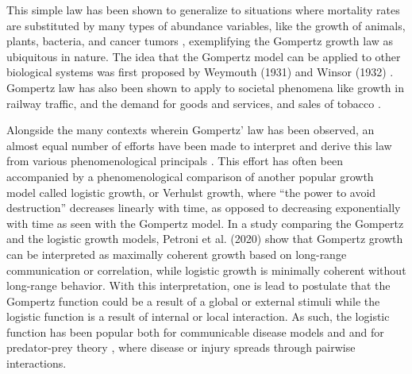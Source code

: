 \documentclass{article}
\begin{document}
This simple law has been shown to generalize to situations where mortality rates are substituted by many types of abundance variables, like the growth of animals, plants, bacteria, and cancer tumors \cite{weymouth1931relative,weymouth1931age,laird1964dynamics,zwietering1990modeling,skinner1994mathematical,starck1998avian,aggrey2002comparison,paine2012fit,benzekry2014classical,halmi2014evaluation,tjorve2010shapes}, exemplifying the Gompertz growth law as ubiquitous in nature. The idea that the Gompertz model can be applied to other biological systems was first proposed by Weymouth (1931) \cite{weymouth1931relative,weymouth1931age} and Winsor (1932) \cite{Winsor1932}. Gompertz law has also been shown to apply to societal phenomena like growth in railway traffic, and the demand for goods and services, and sales of tobacco \cite{olshansky1997ever,prescott1922law,peabody1924growth}.

Alongside the many contexts wherein Gompertz' law has been observed, an almost equal number of efforts have been made to interpret and derive this law from various phenomenological principals \cite{bajzer1997mathematical}. This effort has often been accompanied by a phenomenological comparison of another popular growth model called logistic growth, or Verhulst growth, where ``the power to avoid destruction'' decreases linearly with time, as opposed to decreasing exponentially with time as seen with the Gompertz model. In a study comparing the Gompertz and the logistic growth models, Petroni et al. (2020) \cite{petroni2020logistic} show that Gompertz growth can be interpreted as maximally coherent growth based on long-range communication or correlation, while logistic growth is minimally coherent without long-range behavior. With this interpretation, one is lead to postulate that the Gompertz function could be a result of a global or external stimuli while the logistic function is a result of internal or local interaction. As such, the logistic function has been popular both for communicable disease models \cite{harko2014exact,kroger2020analytical,schlickeiser2021analytical,heng2020approximately} and and for predator-prey theory \cite{berryman1992orgins}, where disease or injury spreads through pairwise interactions. 
\end{document}
